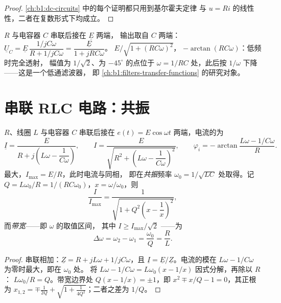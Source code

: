 \begin{proof}
\cref{ch:b1:dc-circuits} 中的每个证明都只用到基尔霍夫定律
与 $u = Ri$ 的线性性，二者在复数形式下均成立。
\end{proof}

\begin{example}[RC 分压器]\label{ex:b1:sinusoidal-impedance:rcdivider}
 $R$ 与电容器 $C$ 串联后接在 $\underline E$ 两端，
输出取自 $C$ 两端：$\underline U_C = \underline E\,\dfrac{1/jC\omega}
{R + 1/jC\omega} = \dfrac{\underline E}{1 + jRC\omega}$。
$E/\sqrt{1 + (RC\omega)^2}$， $-\arctan(RC\omega)$：低频时完全透射，
幅值为 $1/\sqrt2$、为 $-45^\circ$ 的点位于
$\omega = 1/RC$ 处，此后按 $1/\omega$ 下降——这是一个低通滤波器，
即 \cref{ch:b1:filters-transfer-functions} 的研究对象。
\end{example}

\section{串联 RLC 电路：共振}

\begin{theorem}[电流共振]\label{thm:b1:sinusoidal-impedance:resonance}
 $R$、线圈 $L$ 与电容器 $C$ 串联后接在
$e(t) = E\cos\omega t$ 两端，电流的为
\[
\underline I = \frac{E}{R + j\left(L\omega - \dfrac{1}{C\omega}\right)},
\qquad
I = \frac{E}{\sqrt{R^2 + \left(L\omega - \dfrac{1}{C\omega}\right)^2}},
\qquad
\varphi_i = -\arctan\frac{L\omega - 1/C\omega}{R} .
\]
最大，$I_{\max} = E/R$，此时电流与同相，
即在\emph{共振}频率 $\omega_0 = 1/\sqrt{LC}$ 处取得。记
$Q = L\omega_0/R = 1/(RC\omega_0)$，$x = \omega/\omega_0$，则
\[
\frac{I}{I_{\max}} = \frac{1}{\sqrt{1 + Q^2\left(x - \dfrac1x\right)^2}} ,
\]
而\emph{带宽}——即 $\omega$ 的取值区间，
其中 $I \geq I_{\max}/\sqrt2$ ——为
\[
\Delta\omega = \omega_2 - \omega_1 = \frac{\omega_0}{Q} = \frac{R}{L} .
\]
\end{theorem}

\begin{proof}
串联相加：$\underline Z = R + jL\omega + 1/jC\omega$，且
$\underline I = \underline E/\underline Z$。电流的模在
 $L\omega - 1/C\omega$ 为零时最大，即在 $\omega_0$ 处。
将 $L\omega - 1/C\omega = L\omega_0(x - 1/x)$ 因式分解，再除以 $R$：
$L\omega_0/R = Q$。带宽边界处 $Q(x - 1/x) = \pm 1$，即
$x^2 \mp x/Q - 1 = 0$，其正根为 $x_{1,2} = \mp\frac{1}{2Q}
+ \sqrt{1 + \frac{1}{4Q^2}}$；二者之差为 $1/Q$。
\end{proof}

